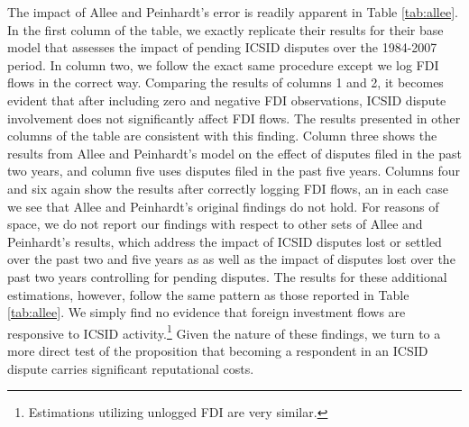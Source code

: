 \documentclass[12pt,onesided]{amsart}
\begin{document}
The impact of Allee and Peinhardt's error is readily apparent in Table \ref{tab:allee}. In the first column of the table, we exactly replicate their results for their base model that assesses the impact of pending ICSID disputes over the 1984-2007 period. In column two, we follow the exact same procedure except we log FDI flows in the correct way. Comparing the results of columns 1 and 2, it becomes evident that after including zero and negative FDI observations, ICSID dispute involvement does not significantly affect FDI flows. The results presented in other columns of the table are consistent with this finding. Column three shows the results from Allee and Peinhardt's model on the effect of disputes filed in the past two years, and column five uses disputes filed in the past five years. Columns four and six again show the results after correctly logging FDI flows, an in each case we see that Allee and Peinhardt's original findings do not hold. For reasons of space, we do not report our findings with respect to other sets of Allee and Peinhardt's results, which address the impact of ICSID disputes lost or settled over the past two and five years as as well as the impact of disputes lost over the past two years controlling for pending disputes. The results for these additional estimations, however, follow the same pattern as those reported in Table \ref{tab:allee}. We simply find no evidence that foreign investment flows are responsive to ICSID activity.\footnote{Estimations utilizing unlogged FDI are very similar.} Given the nature of these findings, we turn to a more direct test of the proposition that becoming a respondent in an ICSID dispute carries significant reputational costs.

\end{document}
